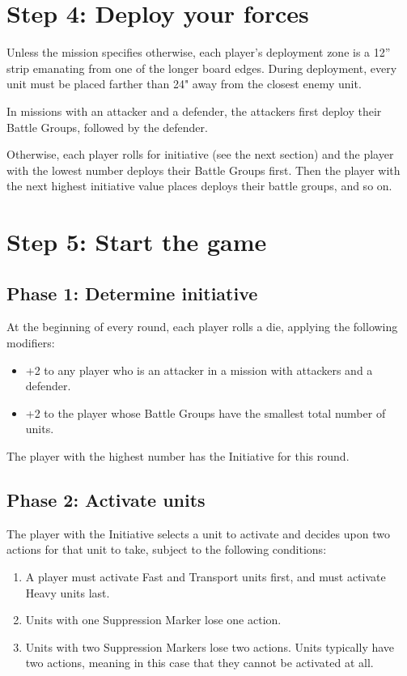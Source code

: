 \begin{multicols}{2}
\section*{Step 4: Deploy your forces}
Unless the mission specifies otherwise, each player's deployment zone is a 12'' strip emanating from one of the longer board edges. During deployment, every unit must be placed farther than 24" away from the closest enemy unit.

In missions with an attacker and a defender, the attackers first deploy their Battle Groups, followed by the defender.

Otherwise, each player rolls for initiative (see the next section) and the player with the lowest number deploys their Battle Groups first. Then the player with the next highest initiative value places deploys their battle groups, and so on.




\section*{Step 5: Start the game}

\subsection*{Phase 1: Determine initiative}

At the beginning of every round, each player rolls a die, applying the following modifiers:
\begin{itemize}
    \item +2 to any player who is an attacker in a mission with attackers and a defender.
    \item +2 to the player whose Battle Groups have the smallest total number of units.
\end{itemize}

The player with the highest number has the Initiative for this round.


\subsection*{Phase 2: Activate units}

The player with the Initiative selects a unit to activate and decides upon two actions for that unit to take, subject to the following conditions:

\begin{enumerate}
    \item A player must activate Fast and Transport units first, and must activate Heavy units last.
    \item Units with one Suppression Marker lose one action.
    \item Units with two Suppression Markers lose two actions. Units typically have two actions, meaning in this case that they cannot be activated at all.
\end{enumerate}


\end{multicols}
